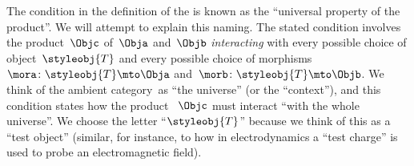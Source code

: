 \begin{remark}
    The condition in the definition of the  is known as the ``universal property of the product''.
    We will attempt to explain this naming.
    The stated condition involves the product~$\Objc$ of~$\Obja$ and~$\Objb$ \emph{interacting} with every possible choice of object~$\styleobj{T}$ and every possible choice of morphisms~$\mora \colon \styleobj{T} \mto \Obja$ and~$\morb\colon \styleobj{T} \mto \Objb$.
    We think of the ambient category~\CatC as ``the universe'' (or the ``context''), and this condition states how the product ~$\Objc$ must interact ``with the whole universe''.
    We choose the letter ``$\styleobj{T}$'' because we think of this as a ``test object'' (similar, for instance,  to how in electrodynamics a ``test charge'' is used to probe an electromagnetic field).
\end{remark}


